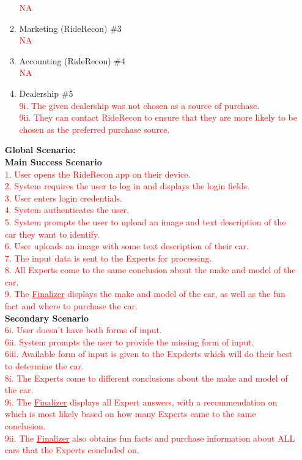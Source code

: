 \documentclass[]{article}
\begin{document}
\begin{enumerate}[label={\bf BE\arabic*.}]
\begin{enumerate}[label=\textbf{VP\arabic*.}]
				\textcolor{red}{NA}
			\item Marketing (RideRecon) \#3 \\
				\textcolor{red}{NA}
			\item Accounting (RideRecon) \#4 \\
				\textcolor{red}{NA}
			\item Dealership \#5 \\
				\textcolor{red}{9i. The given dealership was not chosen as a source of purchase.} \\
				\textcolor{red}{9ii. They can contact RideRecon to ensure that they are more likely to be chosen as the preferred purchase source.}

		\end{enumerate}
		{\bf Global Scenario:}\\
			\textbf{Main Success Scenario} \\
			\textcolor{red}{1. User opens the RideRecon app on their device.} \\
			\textcolor{red}{2. System requires the user to log in and displays the login fields.} \\
			\textcolor{red}{3. User enters login credentials.} \\
			\textcolor{red}{4. System authenticates the user.} \\
			\textcolor{red}{5. System prompts the user to upload an image and text description of the car they want to identify.} \\
			\textcolor{red}{6. User uploads an image with some text description of their car.} \\
			\textcolor{red}{7. The input data is sent to the Experts for processing.} \\
			\textcolor{red}{8. All Experts come to the same conclusion about the make and model of the car.} \\
			\textcolor{red}{9. The \underline{Finalizer} displays the make and model of the car, as well as the fun fact and where to purchase the car.} \\
			\textbf{Secondary Scenario} \\
			\textcolor{red}{6i. User doesn't have both forms of input.} \\
			\textcolor{red}{6ii. System prompts the user to provide the missing form of input.} \\
			\textcolor{red}{6iii. Available form of input is given to the Expderts which will do their best to determine the car.} \\
			\textcolor{red}{8i. The Experts come to different conclusions about the make and model of the car.} \\
			\textcolor{red}{9i. The \underline{Finalizer} displays all Expert answers, with a recommendation on which is most likely based on how many Experts came to the same conclusion.} \\
			\textcolor{red}{9ii. The \underline{Finalizer} also obtains fun facts and purchase information about ALL cars that the Experts concluded on.} \\
			

\end{enumerate}
\end{document}
